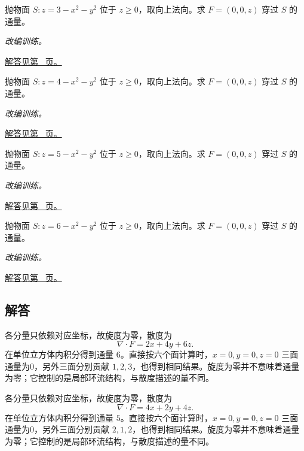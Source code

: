 \documentclass[12pt,fontset=fandol]{ctexart}
\begin{document}
\begin{example}[封闭曲面与缺失底面]\label{ex:c44q21}
抛物面 $S:z=3-x^2-y^2$ 位于 $z\ge0$，取向上法向。求 $F=(0,0,z)$ 穿过 $S$ 的通量。
\par\textit{改编训练。}\par\hyperref[ans:c44q21]{解答见第~\pageref{ans:c44q21} 页。}
\end{example}
\begin{example}[封闭曲面与缺失底面]\label{ex:c44q22}
抛物面 $S:z=4-x^2-y^2$ 位于 $z\ge0$，取向上法向。求 $F=(0,0,z)$ 穿过 $S$ 的通量。
\par\textit{改编训练。}\par\hyperref[ans:c44q22]{解答见第~\pageref{ans:c44q22} 页。}
\end{example}
\begin{example}[封闭曲面与缺失底面]\label{ex:c44q23}
抛物面 $S:z=5-x^2-y^2$ 位于 $z\ge0$，取向上法向。求 $F=(0,0,z)$ 穿过 $S$ 的通量。
\par\textit{改编训练。}\par\hyperref[ans:c44q23]{解答见第~\pageref{ans:c44q23} 页。}
\end{example}
\begin{example}[封闭曲面与缺失底面]\label{ex:c44q24}
抛物面 $S:z=6-x^2-y^2$ 位于 $z\ge0$，取向上法向。求 $F=(0,0,z)$ 穿过 $S$ 的通量。
\par\textit{改编训练。}\par\hyperref[ans:c44q24]{解答见第~\pageref{ans:c44q24} 页。}
\end{example}
\subsection{解答}
\begin{solve}\label{ans:c44q1}
各分量只依赖对应坐标，故旋度为零，散度为
\[
\nabla\cdot F=2x+4y+6z.
\]
在单位立方体内积分得到通量 $6$。直接按六个面计算时，$x=0,y=0,z=0$ 三面通量为0，另外三面分别贡献 $1,2,3$，也得到相同结果。旋度为零并不意味着通量为零；它控制的是局部环流结构，与散度描述的量不同。
\end{solve}

\begin{solve}\label{ans:c44q2}
各分量只依赖对应坐标，故旋度为零，散度为
\[
\nabla\cdot F=4x+2y+4z.
\]
在单位立方体内积分得到通量 $5$。直接按六个面计算时，$x=0,y=0,z=0$ 三面通量为0，另外三面分别贡献 $2,1,2$，也得到相同结果。旋度为零并不意味着通量为零；它控制的是局部环流结构，与散度描述的量不同。
\end{solve}
\end{document}
